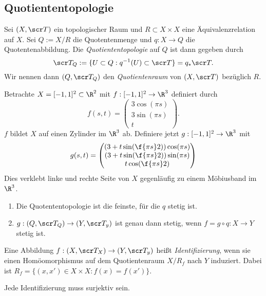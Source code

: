 \subsection{Quotiententopologie}

\begin{df}
	Sei $(X, \scr T)$ ein topologischer Raum und $R \subset X \times X$ eine Äquivalenzrelation auf $X$.
	Sei $Q := X / R$ die Quotentenmenge und $q: X \to Q$ die Quotentenabbildung.
	Die \emph{Quotiententopologie} auf $Q$ ist dann gegeben durch
	\[
		\scr T_Q
		:= \{ U \subset Q : q^{-1}(U) \subset \scr T \}
		= q_* \scr T.
	\]
	Wir nennen dann $(Q, \scr T_Q)$ den \emph{Quotientenraum} von $(X, \scr T)$ bezüglich $R$.
\end{df}

\begin{ex}
	Betrachte $X = [-1,1]^2 \subset \R^2$ mit $f: [-1,1]^2 \to \R^3$ definiert durch
	\[
		f(s, t) = \begin{pmatrix}
			3 \cos(\pi s) \\
			3 \sin(\pi s) \\
			t
		\end{pmatrix}.
	\]
	$f$ bildet $X$ auf einen Zylinder im $\R^3$ ab.
	Definiere jetzt $g: [-1,1]^2 \to \R^3$ mit
	\[
		g(s, t) = \begin{pmatrix}
			(3 + t \sin(\f{\pi s}2)) \cos (\pi s) \\
			(3 + t \sin(\f{\pi s}2)) \sin (\pi s) \\
			t \cos(\f {\pi s}2)
		\end{pmatrix}
	\]
	Dies verklebt linke und rechte Seite von $X$ gegenläufig zu einem Möbiusband im $\R^3$.
\end{ex}

\begin{st}
	\begin{enumerate}[(1)]
		\item
			Die Quotententopologie ist die feinste, für die $q$ stetig ist.
		\item
			$g: (Q, \scr T_Q) \to (Y, \scr T_y)$ ist genau dann stetig, wenn $f = g \circ q: X \to Y$ stetig ist.
	\end{enumerate}
\end{st}

\begin{df}
	Eine Abbildung $f: (X, \scr T_X) \to (Y, \scr T_y)$ heißt \emph{Identifizierung}, wenn sie einen Homöomorphismus auf dem Quotientenraum $X / R_f$ nach $Y$ induziert.
	Dabei ist $R_f = \{ (x,x') \in X \times X : f(x) = f(x') \}$.
	\begin{note}
		Jede Identifizierung muss surjektiv sein.
	\end{note}
\end{df}

